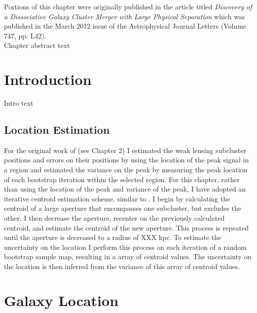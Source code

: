 \label{chapter:4}

\noindent Portions of this chapter were originally published in the article titled \emph{Discovery of a Dissociative Galaxy Cluster Merger with Large Physical Separation} which was published in the March 2012 issue of the Astrophysical Journal Letters (Volume 747, pp. L42). \\

Chapter abstract text

\section{Introduction}



Intro text \citep{Dawson:2012dl}

\subsection{Location Estimation}
For the original work of \citet{Dawson:2012dl} (see Chapter 2) I estimated the weak lensing subcluster positions and errors on their positions by using the location of the peak signal in a region and estimated the variance on the peak by measuring the peak location of each bootstrap iteration within the selected region.  
For this chapter, rather than using the location of the peak and variance of the peak, I have adopted an iterative centroid estimation scheme, similar to \citet{Randall:2008hs}. 
I begin by calculating the centroid of a large aperture that encompasses one subcluster, but excludes the other.
I then decrease the aperture, recenter on the previously calculated centroid, and estimate the centroid of the new aperture.
This process is repeated until the aperture is decreased to a radius of XXX kpc.
To estimate the uncertainty on the location I perform this process on each iteration of a random bootstrap sample map, resulting in a array of centroid values.
 The uncertainty on the location is then inferred from the variance of this array of centroid values.


\section{Galaxy Location}

